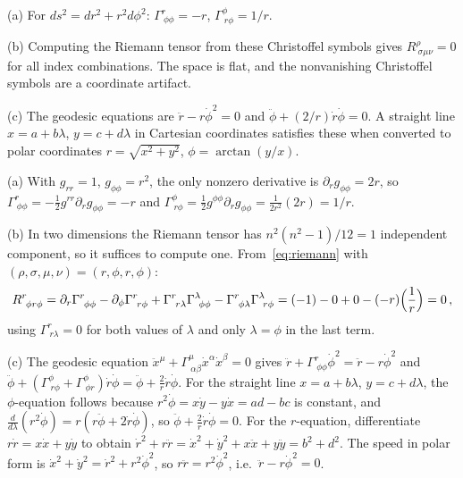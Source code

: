 (a) For $ds^2 = dr^2 + r^2 d\phi^2$:
$\Gamma^r_{\ \phi\phi} = -r$, \quad
$\Gamma^\phi_{\ r\phi} = 1/r$.

(b) Computing the Riemann tensor from these Christoffel symbols gives
$R^\rho_{\ \sigma\mu\nu} = 0$ for all index combinations.  The space is
flat, and the nonvanishing Christoffel symbols are a
coordinate artifact.

(c) The geodesic equations are
$\ddot{r} - r\dot{\phi}^2 = 0$ and
$\ddot{\phi} + (2/r)\dot{r}\dot{\phi} = 0$.
A straight line $x = a + b\lambda$, $y = c + d\lambda$ in Cartesian
coordinates satisfies these when converted to polar coordinates
$r = \sqrt{x^2 + y^2}$, $\phi = \arctan(y/x)$.

\begin{derivation}
(a) With $g_{rr} = 1$, $g_{\phi\phi} = r^2$, the only nonzero derivative is
$\partial_r g_{\phi\phi} = 2r$, so
$\Gamma^r_{\ \phi\phi} = -\tfrac12 g^{rr}\partial_r g_{\phi\phi} = -r$ and
$\Gamma^\phi_{\ r\phi} = \tfrac12 g^{\phi\phi}\partial_r g_{\phi\phi} = \tfrac{1}{2r^2}(2r) = 1/r$.

(b) In two dimensions the Riemann tensor has $n^2(n^2-1)/12 = 1$ independent
component, so it suffices to compute one. From~\eqref{eq:riemann} with
$(\rho,\sigma,\mu,\nu) = (r,\phi,r,\phi)$:
\[
    R^r_{\ \phi r\phi}
    = \partial_r\Gamma^r_{\ \phi\phi} - \partial_\phi\Gamma^r_{\ r\phi}
      + \Gamma^r_{\ r\lambda}\Gamma^\lambda_{\ \phi\phi} - \Gamma^r_{\ \phi\lambda}\Gamma^\lambda_{\ r\phi}
    = (-1) - 0 + 0 - (-r)\Bigl(\frac{1}{r}\Bigr) = 0 \,,
\]
using $\Gamma^r_{\ r\lambda} = 0$ for both values of $\lambda$ and only $\lambda = \phi$ in the
last term.

(c) The geodesic equation $\ddot x^\mu + \Gamma^\mu_{\ \alpha\beta}\dot x^\alpha\dot x^\beta = 0$
gives $\ddot r + \Gamma^r_{\ \phi\phi}\dot\phi^2 = \ddot r - r\dot\phi^2$ and
$\ddot\phi + (\Gamma^\phi_{\ r\phi} + \Gamma^\phi_{\ \phi r})\dot r\dot\phi = \ddot\phi + \tfrac{2}{r}\dot r\dot\phi$.
For the straight line $x = a + b\lambda$, $y = c + d\lambda$, the
$\phi$-equation follows because $r^2\dot\phi = x\dot y - y\dot x = ad - bc$ is constant, and
$\frac{d}{d\lambda}(r^2\dot\phi) = r(r\ddot\phi + 2\dot r\dot\phi)$, so
$\ddot\phi + \tfrac{2}{r}\dot r\dot\phi = 0$.
For the $r$-equation, differentiate $r\dot r = x\dot x + y\dot y$ to obtain
$\dot r^2 + r\ddot r = \dot x^2 + \dot y^2 + x\ddot x + y\ddot y = b^2 + d^2$.
The speed in polar form is $\dot x^2 + \dot y^2 = \dot r^2 + r^2\dot\phi^2$, so
$r\ddot r = r^2\dot\phi^2$, i.e.\ $\ddot r - r\dot\phi^2 = 0$.
\end{derivation}

